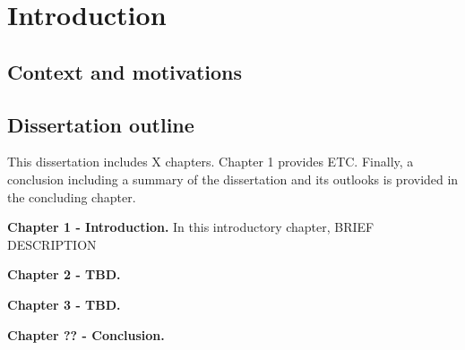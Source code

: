 \chapter{Introduction}
\label{sec:chapter_1_introduction}
\minitoc

	\section{Context and motivations}
	
	
	
	
	
	\section{Dissertation outline}
	

This dissertation includes X chapters. Chapter 1 provides ETC. Finally, a conclusion including a summary of the dissertation and its outlooks is provided in the concluding chapter.  
	
\medskip
\noindent
\textbf{Chapter 1 - Introduction.}
In this introductory chapter, BRIEF DESCRIPTION

\medskip
\noindent
\textbf{Chapter 2 - TBD.} 


\medskip
\noindent
\textbf{Chapter 3 - TBD.}



\medskip
\noindent
\textbf{Chapter ?? - Conclusion.}

